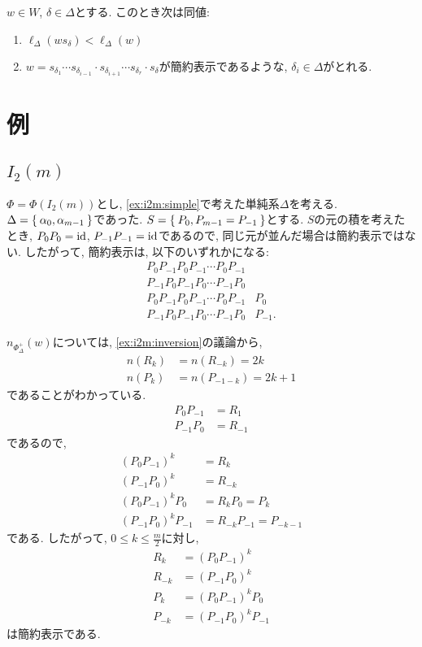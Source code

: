 \begin{cor}
$w\in W$, $\delta\in\Delta$とする.
  このとき次は同値:
  \begin{enumerate}
  \item $\ell_\Delta(ws_\delta)<\ell_\Delta(w)$
  \item $w=s_{\delta_1}\cdots s_{\delta_{i-1}}\cdot s_{\delta_{i+1}}\cdots s_{\delta_r}\cdot s_\delta$が簡約表示であるような,
    $\delta_i\in \Delta$がとれる.
  \end{enumerate}
\end{cor}


\section{例}
\label{ex:i2m:len}
\subsection{$I_2(m)$}
$\Phi=\Phi(I_2(m))$とし,
\cref{ex:i2m:simple}で考えた単純系$\Delta$を考える.
$\Delta=\Set{\alpha_0,\alpha_{m-1}}$であった.
$S=\Set{P_0,P_{m-1}=P_{-1}}$とする.
$S$の元の積を考えたとき,
$P_0P_0=\operatorname{id}$,
$P_{-1}P_{-1}=\operatorname{id}$であるので,
同じ元が並んだ場合は簡約表示ではない.
したがって,
簡約表示は,
以下のいずれかになる:
\begin{align*}
P_0P_{-1}P_0P_{-1}\cdots P_0P_{-1}&\\
P_{-1}P_0P_{-1}P_0\cdots P_{-1}P_0&\\
P_0P_{-1}P_0P_{-1}\cdots P_0P_{-1}&P_0\\
P_{-1}P_0P_{-1}P_0\cdots P_{-1}P_0&P_{-1}.
\end{align*}


$n_{\Phi_\Delta^+}(w)$については,
\cref{ex:i2m:inversion}の議論から,
\begin{align*}
  n(R_{k})&=n(R_{-k})=2k\\
  n(P_{k})&=n(P_{-1-k})=2k+1
\end{align*}
であることがわかっている.
\begin{align*}
  P_0P_{-1}&=R_1\\
  P_{-1}P_0&=R_{-1}
\end{align*}
であるので,
\begin{align*}
  (P_0P_{-1})^k&=R_k\\
  (P_{-1}P_0)^k&=R_{-k}\\
  (P_0P_{-1})^kP_0&=R_kP_0=P_{k}\\
  (P_{-1}P_0)^kP_{-1}&=R_{-k}P_{-1}=P_{-k-1}
\end{align*}
である.
したがって,
$0 \leq k\leq \frac{m}{2}$に対し,
\begin{align*}
  R_k&=(P_0P_{-1})^k\\
  R_{-k}&=(P_{-1}P_0)^k\\
  P_k&=(P_0P_{-1})^kP_0\\
  P_{-k}&=(P_{-1}P_0)^kP_{-1}
\end{align*}
は簡約表示である.


